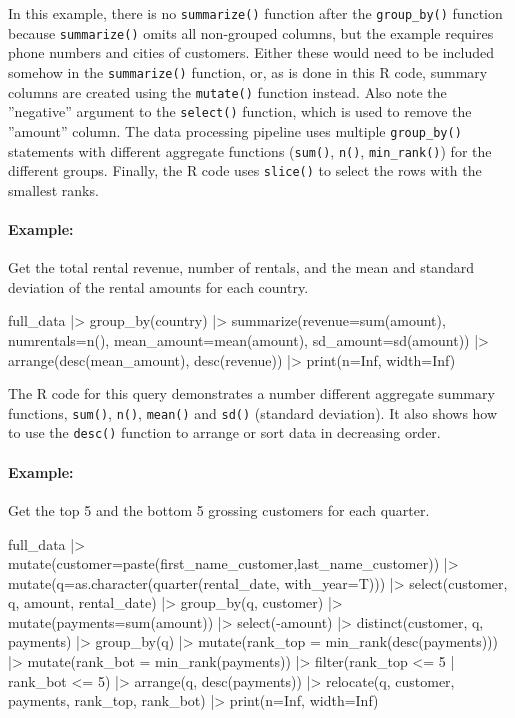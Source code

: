 In this example, there is no \texttt{summarize()} function after the \texttt{group\_by()} function because \texttt{summarize()} omits all non-grouped columns, but the example requires phone numbers and cities of customers. Either these would need to be included somehow in the \texttt{summarize()} function, or, as is done in this R code, summary columns are created using the \texttt{mutate()} function instead.  Also note the ''negative'' argument to the \texttt{select()} function, which is used to remove the ''amount'' column. The data processing pipeline uses multiple \texttt{group\_by()} statements with different aggregate functions (\texttt{sum()}, \texttt{n()}, \texttt{min\_rank()}) for the different groups. Finally, the R code uses \texttt{slice()} to select the rows with the smallest ranks.

\paragraph*{Example:} Get the total rental revenue, number of rentals, and the mean and standard deviation of the rental amounts for each country.

\begin{Rcode}
full_data |>
  group_by(country) |>
  summarize(revenue=sum(amount), 
            numrentals=n(),
            mean_amount=mean(amount),
            sd_amount=sd(amount)) |>
  arrange(desc(mean_amount),
          desc(revenue)) |>
  print(n=Inf, width=Inf)  
\end{Rcode}

The R code for this query demonstrates a number different aggregate summary functions, \texttt{sum()}, \texttt{n()}, \texttt{mean()} and \texttt{sd()} (standard deviation). It also shows how to use the \texttt{desc()} function to arrange or sort data in decreasing order.

\paragraph*{Example:} Get the top 5 and the bottom 5 grossing customers for each quarter.

\begin{Rcode}
full_data |>
  mutate(customer=paste(first_name_customer,last_name_customer)) |>
  mutate(q=as.character(quarter(rental_date, with_year=T))) |>
  select(customer, q, amount, rental_date) |>
  group_by(q, customer) |>
  mutate(payments=sum(amount)) |>
  select(-amount) |>
  distinct(customer, q, payments) |>
  group_by(q) |>
  mutate(rank_top = min_rank(desc(payments))) |>
  mutate(rank_bot = min_rank(payments)) |>
  filter(rank_top <= 5 | rank_bot <= 5) |>
  arrange(q, desc(payments)) |>
  relocate(q, customer, payments, rank_top, rank_bot) |>
  print(n=Inf, width=Inf)
\end{Rcode}

